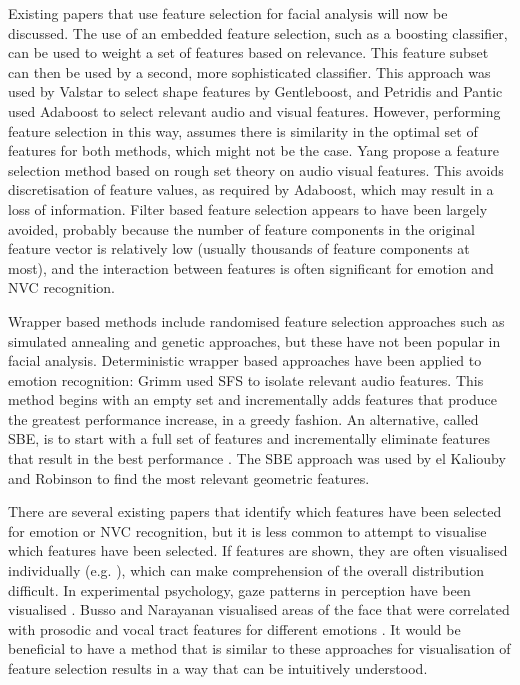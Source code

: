 Existing papers that use feature selection for facial analysis will now be discussed. The use of an embedded feature selection, such as a boosting classifier, can be used to weight a set of features based on relevance. This feature subset can then be used by a second, more sophisticated classifier. This approach was used by Valstar \cite{Valstar2006} to select shape features by Gentleboost, and Petridis and Pantic \cite{Petridis2008} used Adaboost to select relevant audio and visual features. However, performing feature selection in this way, assumes there is similarity in the optimal set of features for both methods, which might not be the case. Yang \etal \cite{Yang2009} propose a feature selection method based on rough set theory on audio visual features. This avoids discretisation of feature values, as required by Adaboost, which may result in a loss of information. Filter based feature selection appears to have been largely avoided, probably because the number of feature components in the original feature vector is relatively low (usually thousands of feature components at most), and the interaction between features is often significant for emotion and \ac{NVC} recognition.

Wrapper based methods include randomised feature selection approaches such as simulated annealing and genetic approaches, but these have not been popular in facial analysis. Deterministic wrapper based approaches have been applied to emotion recognition: Grimm \cite{Grimm2007} used \ac{SFS} to isolate relevant audio features. This method begins with an empty set and incrementally adds features that produce the greatest performance increase, in a greedy fashion. An alternative, called \acf{SBE}, is to start with a full set of features and incrementally eliminate features that result in the best performance \cite{Kittler1978}. The \ac{SBE} approach was used by el Kaliouby and Robinson \cite{ElKaliouby2004} to find the most relevant geometric features.

There are several existing papers that identify which features have been selected for emotion or \ac{NVC} recognition, but it is less common to attempt to visualise which features have been selected. If features are shown, they are often visualised individually (e.g. \cite{Yang2009}), which can make comprehension of the overall distribution difficult. In experimental psychology, gaze patterns in perception have been visualised \cite{Jack2009}. Busso and Narayanan visualised areas of the face that were correlated with prosodic and vocal tract features for different emotions \cite{Busso2007}. It would be beneficial to have a method that is similar to these approaches for visualisation of feature selection results in a way that can be intuitively understood. 

